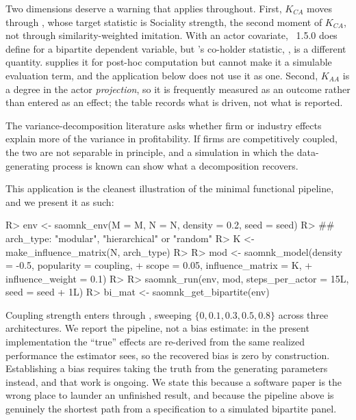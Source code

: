 \documentclass[
  article]{jss}
\begin{document}
Two dimensions deserve a warning that applies throughout. First,
\(K_{CA}\) moves through , whose target statistic is
Sociality strength, the second moment of \(K_{CA}\), not through
similarity-weighted imitation. With an actor covariate,
~1.5.0 does define  for a bipartite
dependent variable, but 's co-holder statistic,
, is a different quantity.
 supplies it for post-hoc computation but cannot make it
a simulable evaluation term, and the application below does not use it
as one. Second, \(K_{AA}\) is a degree in the actor \emph{projection},
so it is frequently measured as an outcome rather than entered as an
effect; the table records what is driven, not what is reported.

The variance-decomposition literature asks whether firm or industry
effects explain more of the variance in profitability. If firms are
competitively coupled, the two are not separable in principle, and a
simulation in which the data-generating process is known can show what a
decomposition recovers.

This application is the cleanest illustration of the minimal functional
pipeline, and we present it as such:

\begin{CodeChunk}
\begin{CodeInput}
R> env <- saomnk_env(M = M, N = N, density = 0.2, seed = seed)
R> ## arch_type: "modular", "hierarchical" or "random"
R> K   <- make_influence_matrix(N, arch_type)
R> 
R> mod <- saomnk_model(density = -0.5, popularity = coupling,
+                     scope = 0.05, influence_matrix = K,
+                     influence_weight = 0.1)
R> 
R> saomnk_run(env, mod, steps_per_actor = 15L, seed = seed + 1L)
R> bi_mat <- saomnk_get_bipartite(env)
\end{CodeInput}
\end{CodeChunk}

Coupling strength enters through , sweeping
\(\{0, 0.1, 0.3,
0.5, 0.8\}\) across three architectures. We report the pipeline, not a
bias estimate: in the present implementation the ``true'' effects are
re-derived from the same realized performance the estimator sees, so the
recovered bias is zero by construction. Establishing a bias requires
taking the truth from the generating parameters instead, and that work
is ongoing. We state this because a software paper is the wrong place to
launder an unfinished result, and because the pipeline above is
genuinely the shortest path from a specification to a simulated
bipartite panel.
\end{document}
